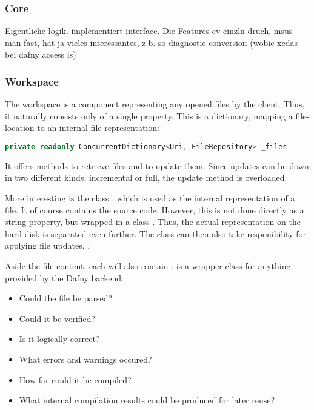 \subsubsection{Core}
Eigentliche logik. implementiert interface. Die Features ev einzln druch, msus man fast, hat ja vieles interessantes, z.b. so diagnostic conversion (wobie xcdas bei dafny access is)

\subsubsection{Workspace}
The workspace is a component representing any opened files by the client. Thus, it naturally consists only of a single property. This is a dictionary, mapping a file-location to an internal file-representation:

\begin{lstlisting}[language=csharp, caption={Workspace Property}, captionpos=b, label={lst:workspaceproperty}]
private readonly ConcurrentDictionary<Uri, FileRepository> _files
\end{lstlisting}

It offers methods to retrieve files and to update them.  Since updates can be down in two different kinds, incremental or full, the update method is overloaded.

More interesting is the class , which is used as the internal representation of a file. It of course contains the source code. However, this is not done directly as a string property, but wrapped in a class . Thus, the actual representation on the hard disk is separated even further. The  class can then also take responibility for applying file updates.
.

Aside the file content, each  will also contain .  is a wrapper class for anything provided by the Dafny backend:
\begin{itemize}
    \item Could the file be parsed?
    \item Could it be verified?
    \item Is it logically correct?
    \item What errors and warnings occured?
    \item How far could it be compiled?
    \item What internal compilation results could be produced for later reuse?
\end{itemize}

